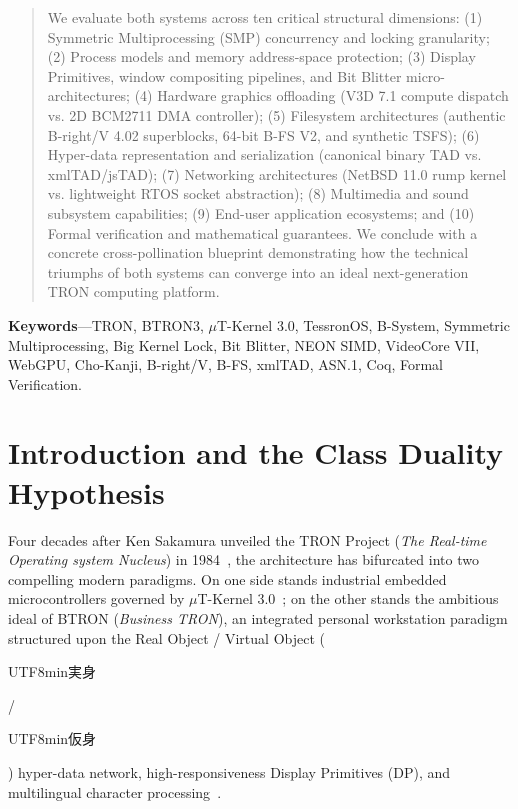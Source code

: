 \documentclass[10pt,journal,compsoc,twocolumn]{article}
\newcommand{\ja}[1]{\begin{CJK*}{UTF8}{min}#1\end{CJK*}}
\begin{document}
\begin{abstract}
We evaluate both systems across ten critical structural dimensions: (1) Symmetric Multiprocessing (SMP) concurrency and locking granularity; (2) Process models and memory address-space protection; (3) Display Primitives, window compositing pipelines, and Bit Blitter micro-architectures; (4) Hardware graphics offloading (V3D 7.1 compute dispatch vs. 2D BCM2711 DMA controller); (5) Filesystem architectures (authentic B-right/V 4.02 superblocks, 64-bit B-FS V2, and synthetic TSFS); (6) Hyper-data representation and serialization (canonical binary TAD vs. xmlTAD/jsTAD); (7) Networking architectures (NetBSD 11.0 rump kernel vs. lightweight RTOS socket abstraction); (8) Multimedia and sound subsystem capabilities; (9) End-user application ecosystems; and (10) Formal verification and mathematical guarantees. We conclude with a concrete cross-pollination blueprint demonstrating how the technical triumphs of both systems can converge into an ideal next-generation TRON computing platform.
\end{abstract}

\noindent\textbf{\small Keywords}---TRON, BTRON3, $\mu$T-Kernel 3.0, TessronOS, B-System, Symmetric Multiprocessing, Big Kernel Lock, Bit Blitter, NEON SIMD, VideoCore VII, WebGPU, Cho-Kanji, B-right/V, B-FS, xmlTAD, ASN.1, Coq, Formal Verification.

\section{Introduction and the Class Duality Hypothesis}
\label{sec:intro}

Four decades after Ken Sakamura unveiled the TRON Project (\emph{The Real-time Operating system Nucleus}) in 1984~\cite{sakamura1984tron}, the architecture has bifurcated into two compelling modern paradigms. On one side stands industrial embedded microcontrollers governed by $\mu$T-Kernel 3.0~\cite{mtk3spec}; on the other stands the ambitious ideal of BTRON (\emph{Business TRON}), an integrated personal workstation paradigm structured upon the Real Object / Virtual Object (\ja{実身}/\ja{仮身}) hyper-data network, high-responsiveness Display Primitives (DP), and multilingual character processing~\cite{btron3spec}.
\end{document}
